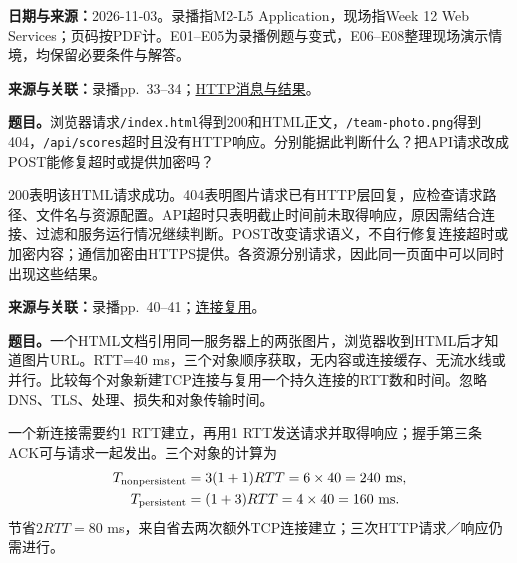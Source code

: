 \begingroup
\renewcommand{\recordid}[1]{}
\renewcommand{\relatedtopic}[2]{\hyperref[topic:#1]{#2}}


\textbf{日期与来源：}2026-11-03。录播指M2-L5 Application，现场指Week 12 Web Services；页码按PDF计。E01--E05为录播例题与变式，E06--E08整理现场演示情境，均保留必要条件与解答。


\textbf{来源与关联：}录播pp.~33--34；\relatedtopic{SC2008-L09-T01}{HTTP消息与结果}。

\textbf{题目。}浏览器请求\nolinkurl{/index.html}得到200和HTML正文，\nolinkurl{/team-photo.png}得到404，\nolinkurl{/api/scores}超时且没有HTTP响应。分别能据此判断什么？把API请求改成POST能修复超时或提供加密吗？

\begin{workedsolution}
200表明该HTML请求成功。404表明图片请求已有HTTP层回复，应检查请求路径、文件名与资源配置。API超时只表明截止时间前未取得响应，原因需结合连接、过滤和服务运行情况继续判断。POST改变请求语义，不自行修复连接超时或加密内容；通信加密由HTTPS提供。各资源分别请求，因此同一页面中可以同时出现这些结果。
\end{workedsolution}


\textbf{来源与关联：}录播pp.~40--41；\relatedtopic{SC2008-L09-T02}{连接复用}。

\textbf{题目。}一个HTML文档引用同一服务器上的两张图片，浏览器收到HTML后才知道图片URL。RTT=40 ms，三个对象顺序获取，无内容或连接缓存、无流水线或并行。比较每个对象新建TCP连接与复用一个持久连接的RTT数和时间。忽略DNS、TLS、处理、损失和对象传输时间。

\begin{workedsolution}
一个新连接需要约1 RTT建立，再用1 RTT发送请求并取得响应；握手第三条ACK可与请求一起发出。三个对象的计算为
\[
\begin{aligned}
 T_{\rm nonpersistent}&=3(1+1)RTT=6\times40=240\text{ ms},\\
 T_{\rm persistent}&=(1+3)RTT=4\times40=160\text{ ms}.
\end{aligned}
\]
节省$2RTT=80$ ms，来自省去两次额外TCP连接建立；三次HTTP请求／响应仍需进行。
\end{workedsolution}

